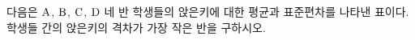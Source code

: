 다음은 $\mathrm{A}$, $\mathrm{B}$, $\mathrm{C}$, $\mathrm{D}$ 네 반 학생들의 앉은키에 대한 평균과 표준편차를 나타낸 표이다. 학생들 간의 앉은키의 격차가 가장 작은 반을 구하시오.
\par\smallskip\begin{center}\resizebox{\ifdim\width>\linewidth\linewidth\else\width\fi}{!}{}\end{center}
